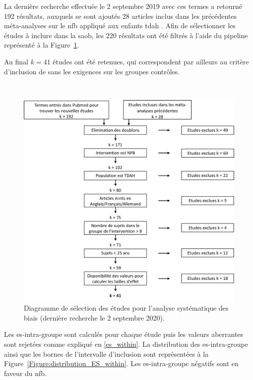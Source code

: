 La dernière recherche effectuée le 2 septembre 2019 avec ces termes a retourné 192 résultats, auxquels se sont ajoutés 28 articles inclus dans les précédentes 
méta-analyses sur le \gls{nfb} appliqué aux enfants \gls{tdah} \citep{Arns2009, Sonuga-Barke2013, Micoulaud2014, 
Cortese2016, Catala2017, VanDoren2019, Riesco2019, Bussalb2019clinical}. 
Afin de sélectionner les études à inclure dans la \gls{saob}, les 220 résultats ont été filtrés à l'aide du pipeline représenté à la 
Figure~\ref{Figure:factors_pipeline_selection_studies}. 

Au final $k = 41$ études ont été retenues, qui correspondent par ailleurs au critère d'inclusion de
\citet{Cortese2016} sans les exigences sur les groupes contrôles. 

\newpage\
\begin{figure}[h!]
  \centering
	\includegraphics[width=1\linewidth]{figures/chapter-3/factors-selection-studies} 
  \caption{Diagramme de sélection des études pour l'analyse systématique des biais (dernière recherche le 2 septembre 2020).} 
  \label{Figure:factors_pipeline_selection_studies}
\end{figure}

Les \gls{es}-intra-groupe sont calculés pour chaque étude puis les valeurs aberrantes sont rejetées comme expliqué en \ref{es_within}. 
La distribution des \gls{es}-intra-groupe ainsi que les bornes de l'intervalle d'inclusion sont représentées à la 
Figure~\ref{Figure:distribution_ES_within}. Les \gls{es}-intra-groupe négatifs sont en faveur du \gls{nfb}.

